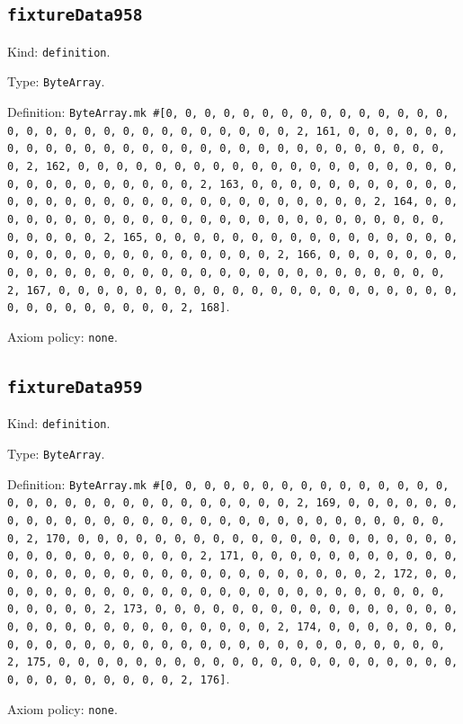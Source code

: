 \documentclass[11pt]{article}
\begin{document}
\subsection*{\texttt{fixtureData958}}
\noindent Kind: \texttt{definition}.\par
\noindent Type: \texttt{ByteArray}.\par
\noindent Definition: \texttt{ByteArray.mk \#[0, 0, 0, 0, 0, 0, 0, 0, 0, 0, 0, 0, 0, 0, 0, 0, 0, 0, 0, 0, 0, 0, 0, 0, 0, 0, 0, 0, 0, 0, 2, 161, 0, 0, 0, 0, 0, 0, 0, 0, 0, 0, 0, 0, 0, 0, 0, 0, 0, 0, 0, 0, 0, 0, 0, 0, 0, 0, 0, 0, 0, 0, 2, 162, 0, 0, 0, 0, 0, 0, 0, 0, 0, 0, 0, 0, 0, 0, 0, 0, 0, 0, 0, 0, 0, 0, 0, 0, 0, 0, 0, 0, 0, 0, 2, 163, 0, 0, 0, 0, 0, 0, 0, 0, 0, 0, 0, 0, 0, 0, 0, 0, 0, 0, 0, 0, 0, 0, 0, 0, 0, 0, 0, 0, 0, 0, 2, 164, 0, 0, 0, 0, 0, 0, 0, 0, 0, 0, 0, 0, 0, 0, 0, 0, 0, 0, 0, 0, 0, 0, 0, 0, 0, 0, 0, 0, 0, 0, 2, 165, 0, 0, 0, 0, 0, 0, 0, 0, 0, 0, 0, 0, 0, 0, 0, 0, 0, 0, 0, 0, 0, 0, 0, 0, 0, 0, 0, 0, 0, 0, 2, 166, 0, 0, 0, 0, 0, 0, 0, 0, 0, 0, 0, 0, 0, 0, 0, 0, 0, 0, 0, 0, 0, 0, 0, 0, 0, 0, 0, 0, 0, 0, 2, 167, 0, 0, 0, 0, 0, 0, 0, 0, 0, 0, 0, 0, 0, 0, 0, 0, 0, 0, 0, 0, 0, 0, 0, 0, 0, 0, 0, 0, 0, 0, 2, 168]}.\par
\noindent Axiom policy: \texttt{none}.\par
\subsection*{\texttt{fixtureData959}}
\noindent Kind: \texttt{definition}.\par
\noindent Type: \texttt{ByteArray}.\par
\noindent Definition: \texttt{ByteArray.mk \#[0, 0, 0, 0, 0, 0, 0, 0, 0, 0, 0, 0, 0, 0, 0, 0, 0, 0, 0, 0, 0, 0, 0, 0, 0, 0, 0, 0, 0, 0, 2, 169, 0, 0, 0, 0, 0, 0, 0, 0, 0, 0, 0, 0, 0, 0, 0, 0, 0, 0, 0, 0, 0, 0, 0, 0, 0, 0, 0, 0, 0, 0, 2, 170, 0, 0, 0, 0, 0, 0, 0, 0, 0, 0, 0, 0, 0, 0, 0, 0, 0, 0, 0, 0, 0, 0, 0, 0, 0, 0, 0, 0, 0, 0, 2, 171, 0, 0, 0, 0, 0, 0, 0, 0, 0, 0, 0, 0, 0, 0, 0, 0, 0, 0, 0, 0, 0, 0, 0, 0, 0, 0, 0, 0, 0, 0, 2, 172, 0, 0, 0, 0, 0, 0, 0, 0, 0, 0, 0, 0, 0, 0, 0, 0, 0, 0, 0, 0, 0, 0, 0, 0, 0, 0, 0, 0, 0, 0, 2, 173, 0, 0, 0, 0, 0, 0, 0, 0, 0, 0, 0, 0, 0, 0, 0, 0, 0, 0, 0, 0, 0, 0, 0, 0, 0, 0, 0, 0, 0, 0, 2, 174, 0, 0, 0, 0, 0, 0, 0, 0, 0, 0, 0, 0, 0, 0, 0, 0, 0, 0, 0, 0, 0, 0, 0, 0, 0, 0, 0, 0, 0, 0, 2, 175, 0, 0, 0, 0, 0, 0, 0, 0, 0, 0, 0, 0, 0, 0, 0, 0, 0, 0, 0, 0, 0, 0, 0, 0, 0, 0, 0, 0, 0, 0, 2, 176]}.\par
\noindent Axiom policy: \texttt{none}.\par
\end{document}
